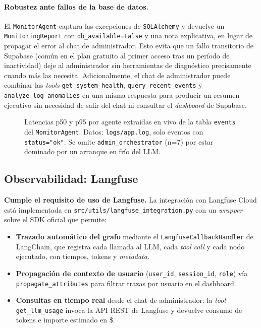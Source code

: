 \paragraph{Robustez ante fallos de la base de datos.} El
\texttt{MonitorAgent} captura las excepciones de \texttt{SQLAlchemy}
y devuelve un \texttt{MonitoringReport} con
\texttt{db\_available=False} y una nota explicativa, en lugar de
propagar el error al chat de administrador. Esto evita que un fallo
transitorio de Supabase (común en el plan gratuito al primer acceso
tras un período de inactividad) deje al administrador sin
herramientas de diagnóstico precisamente cuando más las necesita.
Adicionalmente, el chat de administrador puede combinar las
\textit{tools} \texttt{get\_system\_health}, \texttt{query\_recent\_events}
y \texttt{analyze\_log\_anomalies} en una misma respuesta para
producir un resumen ejecutivo sin necesidad de salir del chat ni
consultar el \textit{dashboard} de Supabase.

\begin{figure}[t]
    \centering
    
    \caption{Latencias p50 y p95 por agente extraídas en vivo de la
    tabla \texttt{events} del \texttt{MonitorAgent}. Datos:
    \texttt{logs/app.log}, solo eventos con \texttt{status="ok"}.
    Se omite \texttt{admin\_orchestrator} (n=7) por estar dominado
    por un arranque en frío del LLM.}
    \label{fig:monitor-latency}
\end{figure}

\subsection{Observabilidad: Langfuse}
\label{subsec:langfuse}

\textbf{Cumple el requisito de uso de Langfuse.}
La integración con Langfuse Cloud está implementada en
\texttt{src/utils/langfuse\_integration.py} con un \textit{wrapper}
sobre el SDK oficial que permite:

\begin{itemize}[leftmargin=1.5em,itemsep=0.2em]
  \item \textbf{Trazado automático del grafo} mediante el
        \texttt{LangfuseCallbackHandler} de LangChain, que registra
        cada llamada al LLM, cada \textit{tool call} y cada nodo
        ejecutado, con tiempos, tokens y \textit{metadata}.
  \item \textbf{Propagación de contexto de usuario}
        (\texttt{user\_id}, \texttt{session\_id}, \texttt{role}) vía
        \texttt{propagate\_attributes} para filtrar trazas por
        usuario en el dashboard.
  \item \textbf{Consultas en tiempo real} desde el chat de
        administrador: la \textit{tool} \texttt{get\_llm\_usage}
        invoca la API REST de Langfuse y devuelve consumo de tokens
        e importe estimado en \$.
\end{itemize}

